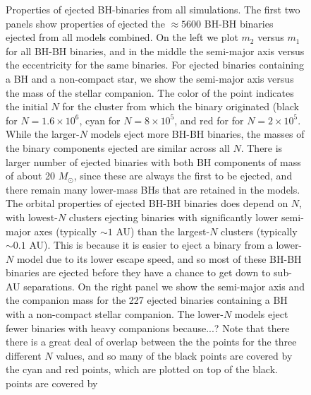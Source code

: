 \documentclass[12pt,preprint]{aastex}
\begin{document}
\begin{figure}[!ht]


	
	\caption{Properties of ejected BH-binaries from all simulations. The first two panels show properties of ejected 
	the $\approx 5600$ BH-BH binaries ejected from all models combined.
	On the left we plot $m_2$ versus $m_1$ for all BH-BH binaries, and in the middle the semi-major axis versus the eccentricity 
	for the same binaries. For ejected binaries containing a BH and a non-compact star, we show the semi-major axis versus the 
	mass of the stellar companion. The color of the point indicates the initial $N$ for the cluster from which the binary originated
	(black for $N=1.6 \times 10^6$, cyan for $N=8 \times 10^5$, and red for for $N=2 \times 10^5$. While the larger-$N$ models
	eject more BH-BH binaries, the masses of the binary components ejected are similar across all $N$. There is larger number
	of ejected binaries with both BH components of mass of about 20 $M_\odot$, since these are always the first to be ejected, and
	there remain many lower-mass BHs that are retained in the models. The orbital properties of ejected BH-BH binaries does 
	depend on $N$, with lowest-$N$ clusters ejecting binaries with significantly lower semi-major axes (typically $\sim 1$ AU) 
	than the largest-$N$ clusters (typically $\sim 0.1$ AU). This is because it is easier to eject a binary from a lower-$N$ model
	due to its lower escape speed, and so most of these BH-BH binaries are ejected before they have a chance to get down 
	to sub-AU separations.
	On the right panel we show the semi-major axis and the companion mass for the 227 ejected binaries containing a BH with a non-compact
	stellar companion. The lower-$N$ models eject fewer binaries with heavy companions because...?
	Note that there there is a great
	deal of overlap between the the points for the three different $N$ values, and so many of the black points are covered by the cyan
	and red points, which are plotted on top of the black.
	points are covered by
	}
	\label{fig:bh_binary_properties}
\end{figure}
\end{document}

